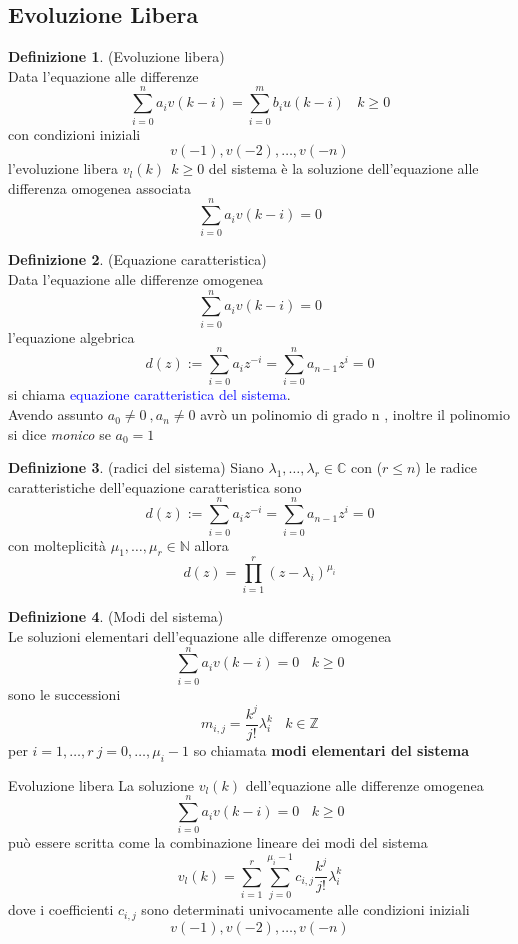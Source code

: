 \documentclass{article}
\theoremstyle{definition}
\newtheorem*{definizione}{Definizione}
\newcommand{\C}{\mathbb{C}}
\newcommand{\la}{\lambda}
\newcommand{\sisdiscro}{\sum_{i=0}^n a_iv(k-i)=\sum_{i=0}^m b_iu(k-i) \ \ \ \ k \geq 0}
\begin{document}
	\subsection{Evoluzione Libera}
	\begin{definizione}(Evoluzione libera) \\
		Data l'equazione alle differenze $$\sisdiscro$$ con condizioni iniziali $$v(-1),v(-2), \dots , v(-n)$$
l'evoluzione libera $v_l(k) \ \ k \geq 0$ del sistema è la soluzione dell'equazione alle differenza omogenea associata
$$\sum_{i=0}^{n}a_i v(k-i)=0$$
	\end{definizione}
	\begin{definizione}(Equazione caratteristica)\\
		Data l'equazione alle differenze omogenea
		$$\sum_{i=0}^{n}a_i v(k-i)=0$$
		l'equazione algebrica 
		$$d(z):=\sum_{i=0}^{n}a_iz^{-i}=\sum_{i=0}^{n}a_{n-1} z^i=0$$
		si chiama \textcolor{blue}{equazione caratteristica del sistema}. \\
		Avendo assunto $a_0\neq 0 \ , a_n \neq 0$ avrò un polinomio di grado n , inoltre il polinomio si dice \textit{monico} se $a_0=1$  
	\end{definizione}
	\begin{definizione}(radici del sistema)
		Siano $\la_1 , \dots , \la _r \in \C$ con ($r \leq n$) le radice caratteristiche dell'equazione caratteristica sono 
		$$d(z):=\sum_{i=0}^{n}a_iz^{-i}=\sum_{i=0}^{n}a_{n-1} z^i=0$$
		con molteplicità $\mu_1 , \dots , \mu_r \in \mathbb{N}$ allora 
		$$d(z)=\prod_{i=1}^r (z-\la_i)^{\mu_i}$$
	\end{definizione}
	\begin{definizione}(Modi del sistema)\\
		Le soluzioni elementari dell'equazione alle differenze omogenea
$$\sum_{i=0}^{n}a_i v(k-i)=0 \ \  \ \ k \geq 0$$
sono le successioni 
$$m_{i,j}=\frac{k^j}{j!}\la_i^k \ \ \ \ k \in \mathbb{Z}$$
per $i=1, \dots , r \ j=0,\dots , \mu_i-1$ so chiamata \textbf{modi elementari del sistema}
	\end{definizione}
	\begin{teo}{Evoluzione libera}{}
		La soluzione $v_l(k)$ dell'equazione alle differenze omogenea 
		$$\sum_{i=0}^{n}a_i v(k-i)=0 \ \  \ \ k \geq 0$$ 
		può essere scritta come la combinazione lineare dei modi del sistema 
		$$v_l(k)=\sum_{i=1}^{r}\sum_{j=0}^{\mu_i-1}c_{i,j}\frac{k^j}{j!}\la_i^k$$
		dove i coefficienti $c_{i,j}$ sono determinati univocamente alle condizioni iniziali 
		$$v(-1),v(-2), \dots , v(-n)$$
	\end{teo}
\end{document}
